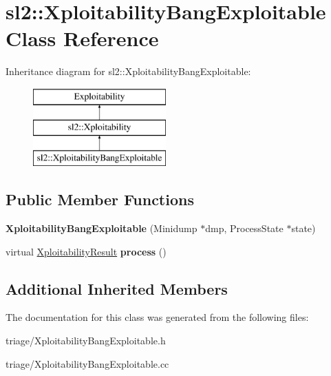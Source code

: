 \hypertarget{classsl2_1_1_xploitability_bang_exploitable}{}\section{sl2\+:\+:Xploitability\+Bang\+Exploitable Class Reference}
\label{classsl2_1_1_xploitability_bang_exploitable}
Inheritance diagram for sl2\+:\+:Xploitability\+Bang\+Exploitable\+:\begin{figure}[H]
\begin{center}
\leavevmode
\includegraphics[height=3.000000cm]{dc/d9b/classsl2_1_1_xploitability_bang_exploitable}
\end{center}
\end{figure}
\subsection*{Public Member Functions}
\begin{DoxyCompactItemize}
\item 
\mbox{\label{classsl2_1_1_xploitability_bang_exploitable_a1a93c9f2c90bd59b078700c220befb85}} 
{\bfseries Xploitability\+Bang\+Exploitable} (Minidump $\ast$dmp, Process\+State $\ast$state)
\item 
\mbox{\label{classsl2_1_1_xploitability_bang_exploitable_a7ef83842257a5bd9d294ad8dcec492fb}} 
virtual \mbox{\hyperlink{classsl2_1_1_xploitability_result}{Xploitability\+Result}} {\bfseries process} ()
\end{DoxyCompactItemize}
\subsection*{Additional Inherited Members}


The documentation for this class was generated from the following files\+:\begin{DoxyCompactItemize}
\item 
triage/Xploitability\+Bang\+Exploitable.\+h\item 
triage/Xploitability\+Bang\+Exploitable.\+cc\end{DoxyCompactItemize}

